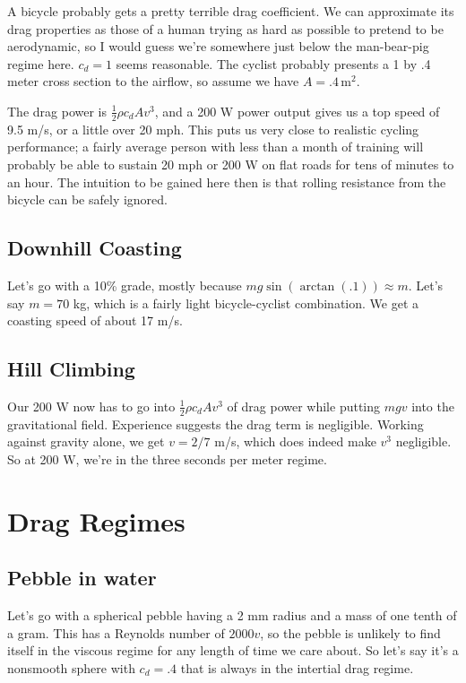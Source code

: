 \documentclass[12pt]{article}
\begin{document}
A bicycle probably gets a pretty terrible drag coefficient. We can approximate its drag properties as those of a human trying as hard as possible to pretend to be aerodynamic, so I would guess we're somewhere just below the man-bear-pig regime here. \(c_d = 1\) seems reasonable. The cyclist probably presents a 1 by .4 meter cross section to the airflow, so assume we  have \(A = .4 \, \mathrm{m}^2\).

The drag power is \(\frac{1}{2}\rho c_d A v^3\), and a 200 W power output gives us a top speed of 9.5 m/s, or a little over 20 mph. This puts us very close to realistic cycling performance; a fairly average person with less than a month of training will probably be able to sustain 20 mph or 200 W on flat roads for tens of minutes to an hour. The intuition to be gained here then is that rolling resistance from the bicycle can be safely ignored.

\subsection{Downhill Coasting}

Let's go with a 10\% grade, mostly because \(mg\sin(\arctan(.1)) \approx m\). Let's say \(m=70\) kg, which is a fairly light bicycle-cyclist combination. We get a coasting speed of about 17 m/s.

\subsection{Hill Climbing}

Our 200 W now has to go into \(\frac{1}{2}\rho c_d A v^3\) of drag power while putting \(mgv\) into the gravitational field. Experience suggests the drag term is negligible. Working against gravity alone, we get \(v=2/7\) m/s, which does indeed make \(v^3\) negligible. So at 200 W, we're in the three seconds per meter regime.

\section{Drag Regimes}

\subsection{Pebble in water}

Let's go with a spherical pebble having a 2 mm radius and a mass of one tenth of a gram. This has a Reynolds number of \(2000v\), so the pebble is unlikely to find itself in the viscous regime for any length of time we care about. So let's say it's a nonsmooth sphere with \(c_d=.4\) that is always in the intertial drag regime.
\end{document}
